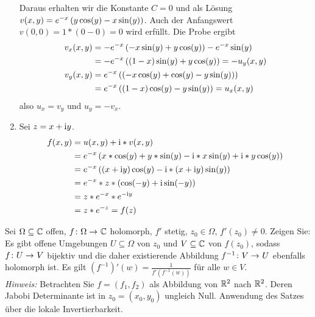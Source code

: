 \begin{exercisePage}
\begin{enumerate}[label=(zu \alph*), leftmargin=*]
\begin{equation*}
		\end{equation*}
		Daraus erhalten wir die Konstante $C = 0$ und als Lösung $v(x,y) = e^{-x} \left( y\cos(y) - x\sin(y) \right)$. Auch der Anfangswert $v(0,0) = 1 * (0-0) = 0$ wird erfüllt.
		Die Probe ergibt
		\begin{equation*}
			\begin{aligned}
				v_x(x,y) 
				&= -e^{-x} \left(  -x \sin(y) + y \cos(y) \right) - e^{-x} \sin(y)\\
				&= -e^{-x} \left( (1-x) \sin(y) + y \cos(y) \right) = -u_y(x,y) \\
				v_y(x,y) &= e^{-x} \left( (-x \cos(y) + \cos(y) - y \sin(y)) \right) \\
				&= e^{-x} \left( (1-x) \cos(y) - y \sin(y) \right) = u_x(x,y)
			\end{aligned}
		\end{equation*}
		also $u_x = v_y$ und $u_y = - v_x$.
		\item Sei $z = x + \mathrm{i} y$.
		\begin{equation*}
			\begin{aligned}
				f(x,y) &= u(x,y) + \mathrm{i} * v(x,y) \\
				&= e^{-x} \left( x * \cos(y) + y * \sin(y) - \mathrm{i} * x \sin(y) + \mathrm{i} * y \cos(y) \right) \\
				&= e^{-x} \left( (x + \mathrm{i} y) \cos(y) - \mathrm{i} * (x + \mathrm{i} y) \sin(y) \right) \\
				&= e^{-x} * z * \left( \cos(-y) + \mathrm{i} \sin(-y) \right) \\
				&= z * e^{-x} * e^{- \mathrm{i} y} \\
				&= z *e^{-z}
				= f(z)
			\end{aligned}
		\end{equation*}
	\end{enumerate}
	\begin{task}
		Sei $\Omega \subseteq \mathbb{C}$ offen, $\abb{f}{\Omega}{\CC}$ holomorph, $f'$ stetig, $z_0 \in \Omega$, $f'(z_0) \neq 0$. Zeigen Sie: Es gibt offene Umgebungen $U \subseteq \Omega$ von $z_0$ und $V \subseteq \mathbb{C}$ von $f(z_0)$, sodass $\abb{f}{U}{V}$ bijektiv und die daher existierende Abbildung $\abb{f^{-1}}{V}{U}$ ebenfalls holomorph ist. Es gilt $(f^{-1})'(w) = \frac{1}{f'(f^{-1}(w))}$ für alle $w \in V$. \\
		\textit{Hinweis:} Betrachten Sie $f = (f_1, f_2)$ als Abbildung von $\mathbb{R}^2$ nach $\mathbb{R}^2$. Deren Jabobi Determinante ist in $z_0 = (x_0, y_0)$ ungleich Null. Anwendung des Satzes über die lokale Invertierbarkeit.
	\end{task}


\end{exercisePage}
